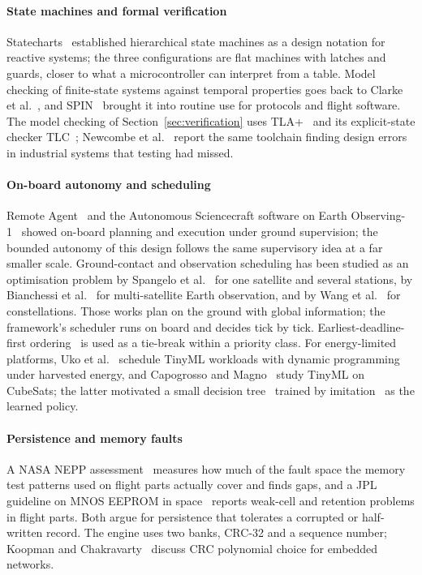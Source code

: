 \documentclass[preprint,12pt]{elsarticle}
\begin{document}
\paragraph{State machines and formal verification} Statecharts~\cite{Harel1987Statecharts} established hierarchical state machines as a design notation for reactive systems; the three configurations are flat machines with latches and guards, closer to what a microcontroller can interpret from a table. Model checking of finite-state systems against temporal properties goes back to Clarke et al.~\cite{Clarke1986ModelChecking}, and SPIN~\cite{Holzmann1997SPIN} brought it into routine use for protocols and flight software. The model checking of Section~\ref{sec:verification} uses TLA+~\cite{Lamport2002TLA} and its explicit-state checker TLC~\cite{Yu1999TLC}; Newcombe et al.~\cite{Newcombe2015AWS} report the same toolchain finding design errors in industrial systems that testing had missed.

\paragraph{On-board autonomy and scheduling} Remote Agent~\cite{Muscettola1998RemoteAgent} and the Autonomous Sciencecraft software on Earth Observing-1~\cite{Chien2005EO1} showed on-board planning and execution under ground supervision; the bounded autonomy of this design follows the same supervisory idea at a far smaller scale. Ground-contact and observation scheduling has been studied as an optimisation problem by Spangelo et al.~\cite{Spangelo2015GroundStation} for one satellite and several stations, by Bianchessi et al.~\cite{Bianchessi2007EOS} for multi-satellite Earth observation, and by Wang et al.~\cite{Wang2011EOSConstellation} for constellations. Those works plan on the ground with global information; the framework's scheduler runs on board and decides tick by tick. Earliest-deadline-first ordering~\cite{Liu1973EDF} is used as a tie-break within a priority class. For energy-limited platforms, Uko et al.~\cite{Uko2026TinyML} schedule TinyML workloads with dynamic programming under harvested energy, and Capogrosso and Magno~\cite{Capogrosso2026TinyML} study TinyML on CubeSats; the latter motivated a small decision tree~\cite{Quinlan1986ID3} trained by imitation~\cite{Hussein2017Imitation} as the learned policy.

\paragraph{Persistence and memory faults} A NASA NEPP assessment~\cite{Murphy2022NEPP} measures how much of the fault space the memory test patterns used on flight parts actually cover and finds gaps, and a JPL guideline on MNOS EEPROM in space~\cite{Chen2006EEPROM} reports weak-cell and retention problems in flight parts. Both argue for persistence that tolerates a corrupted or half-written record. The engine uses two banks, CRC-32 and a sequence number; Koopman and Chakravarty~\cite{Koopman2004CRC} discuss CRC polynomial choice for embedded networks.
\end{document}
